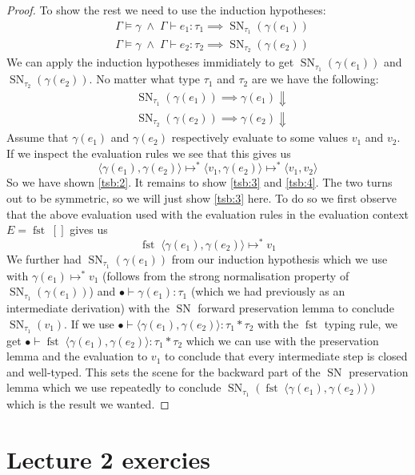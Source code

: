 \documentclass[a4paper,10pt,fleqn]{article}
\newcommand{\tuple}[1]{\ensuremath{\langle #1 \rangle}}
\DeclareMathOperator{\SNPred}{SN}
\DeclareMathOperator{\fst}{fst}
\newcommand{\evalto}{\ensuremath{\mapsto}}
\newcommand{\evaltos}[1][*]{\ensuremath{\evalto^{#1}}}
\newcommand{\mtenv}{\ensuremath{\bullet}}
\newcommand{\SN}[2]{\ensuremath{\SNPred_{#1}(#2)}}
\newcommand{\pand}{\ensuremath{\; \wedge \;}}
\begin{document}
\begin{proof}
To show the rest we need to use the induction hypotheses:
  \begin{align*}
   & \Gamma \models \gamma \pand \Gamma \vdash e_1 : \tau_1 \implies \SN{\tau_1}{\gamma(e_1)} \\
   & \Gamma \models \gamma \pand \Gamma \vdash e_2 : \tau_2 \implies \SN{\tau_2}{\gamma(e_2)}
  \end{align*}
  We can apply the induction hypotheses immidiately to get $\SN{\tau_1}{\gamma(e_1)}$ and $\SN{\tau_2}{\gamma(e_2)}$. No matter what type $\tau_1$ and $\tau_2$ are we have the following:
  \begin{align*}
   &\SN{\tau_1}{\gamma(e_1)} \implies \gamma(e_1) \Downarrow \\
   &\SN{\tau_2}{\gamma(e_2)} \implies \gamma(e_2) \Downarrow
  \end{align*}
  Assume that $\gamma(e_1)$ and $\gamma(e_2)$ respectively evaluate to some values $v_1$ and $v_2$. If we inspect the evaluation rules we see that this gives us
  \[
    \tuple{\gamma(e_1),\gamma(e_2)} \evaltos \tuple{v_1,\gamma(e_2)} \evaltos \tuple{v_1,v_2}
  \]
So we have shown \ref{tsb:2}. It remains to show \ref{tsb:3} and \ref{tsb:4}. The two turns out to be symmetric, so we will just show \ref{tsb:3} here. To do so we first observe that the above evaluation used with the evaluation rules in the evaluation context $E=\fst \; []$ gives us
  \[
    \fst \; \tuple{\gamma(e_1),\gamma(e_2)} \evaltos v_1
  \]
We further had $\SN{\tau_1}{\gamma(e_1)}$ from our induction hypothesis which we use with $\gamma(e_1) \evaltos v_1$ (follows from the strong normalisation property of $\SN{\tau_1}{\gamma(e_1)}$) and $\mtenv \vdash \gamma(e_1) : \tau_1$ (which we had previously as an intermediate derivation) with the $\SNPred$ forward preservation lemma to conclude $\SN{\tau_1}{v_1}$. If we use $\mtenv \vdash \tuple{\gamma(e_1),\gamma(e_2)}: \tau_1 * \tau_2$ with the $\fst$ typing rule, we get $\mtenv \vdash \fst \; \tuple{\gamma(e_1),\gamma(e_2)}: \tau_1 * \tau_2$ which we can use with the preservation lemma and the evaluation to $v_1$ to conclude that every intermediate step is closed and well-typed. This sets the scene for the backward part of the $\SNPred$ preservation lemma which we use repeatedly to conclude $\SN{\tau_1}{\fst \; \tuple{\gamma(e_1),\gamma(e_2)}}$ which is the result we wanted.
\end{proof}

\section*{Lecture 2 exercies}
\end{document}
